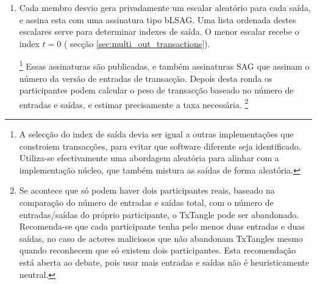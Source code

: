 \begin{enumerate}
    \item Cada membro desvio gera privadamente um escalar aleatório para cada saída, e assina esta com uma assinatura tipo bLSAG. Uma lista ordenada destes escalares serve para determinar indexes de saída. O menor escalar recebe o index $t = 0$ ( secção \ref{sec:multi_out_transactions}).   

\footnote{A selecção do index de saída devia ser igual a outras implementações que constroiem transacções, para evitar que software diferente seja identificado. Utiliza-se efectivamente uma abordagem aleatória para alinhar com a implementação núcleo, que também mistura as saídas de forma aleatória.}  
Essas assinaturas são publicadas, e também assinaturas SAG que assinam o número da versão de entradas de transacção. Depois desta ronda os participantes podem calcular o peso de transacção baseado no número de entradas e saídas, e estimar precisamente a taxa necessária.
\footnote{Se acontece que só podem haver dois participantes reais, baseado na comparação do número de entradas e saídas total, com o número de entradas/saídas do próprio participante, o TxTangle pode ser abandonado. Recomenda-se que cada participante tenha pelo menos duas entradas e duas saídas, no caso de actores maliciosos que não abandonam TxTangles mesmo quando reconhecem que só existem dois participantes. Esta recomendação está aberta ao debate, pois usar mais entradas e saídas não é heuristicamente neutral.}

\end{enumerate}
